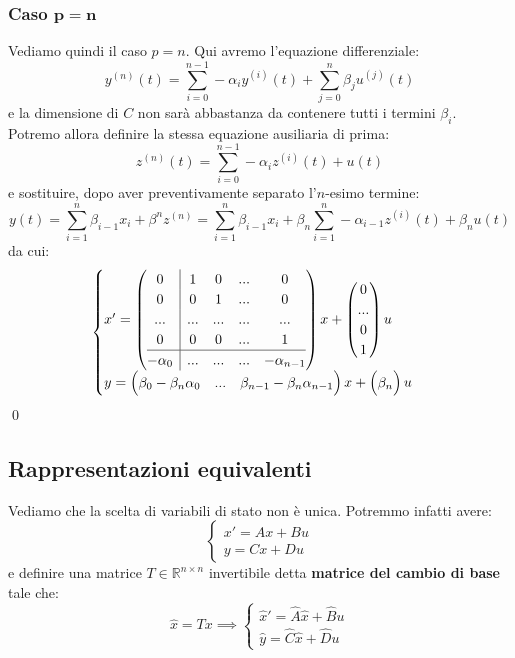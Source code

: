 \documentclass[a4paper,11pt]{article}
\begin{document}
\subsubsection{Caso $\mathbf{p = n}$}
Vediamo quindi il caso $p = n$. 
Qui avremo l'equazione differenziale:
$$
y^{(n)} (t) = \sum_{i=0}^{n-1} - \alpha_i y^{(i)}(t) + \sum_{j=0}^n \beta_j u^{(j)}(t)
$$
e la dimensione di $C$ non sarà abbastanza da contenere tutti i termini $\beta_i$.
Potremo allora definire la stessa equazione ausiliaria di prima:
$$
z^{(n)}(t) = \sum_{i = 0}^{n - 1} -\alpha_i z^{(i)}(t) + u(t)
$$
e sostituire, dopo aver preventivamente separato l'$n$-esimo termine:
$$
y(t) = \sum_{i = 1}^n \beta_{i - 1} x_i + \beta^n z^{(n)} = \sum_{i = 1}^n \beta_{i - 1} x_i + \beta_n \sum_{i = 1}^{n} -\alpha_{i - 1} z^{(i)}(t) + \beta_n u(t)
$$
da cui:
\[
	\begin{cases}	
x' = \left(\begin{array}{@{}c | cccc@{}}
	0 & 1 & 0 & ... & 0 \\
	0 & 0 & 1 & ... & 0 \\
	... & ... & ... & ... & ... \\
	0 & 0 & 0 & ... & 1 \\
	\hline
	-\alpha_0 & ... & ... & ... & -\alpha_{n - 1}
\end{array}\right)
x + \begin{pmatrix}
0 \\
... \\
0 \\
1
\end{pmatrix} u \\ 
y = \begin{pmatrix}
	\beta_0 - \beta_n \alpha_0 & ... & \beta_{n - 1} - \beta_n \alpha_{n - 1}	
\end{pmatrix} x + \begin{pmatrix}
\beta_n
\end{pmatrix} u
	\end{cases}
\]
\qed

\subsection{Rappresentazioni equivalenti}
Vediamo che la scelta di variabili di stato non è unica.
Potremmo infatti avere:
\[
	\begin{cases}
		x' = Ax + Bu \\
		y = Cx + Du
	\end{cases}
\]
e definire una matrice $T \in \mathbb{R}^{n \times n}$ invertibile detta \textbf{matrice del cambio di base} tale che:
$$
\hat{x} = Tx \implies 
\begin{cases}
	\hat{x}' = \hat{A}\hat{x} + \hat{B}u \\
	\hat{y} = \hat{C}\hat{x} + \hat{D}u
\end{cases}
$$
\end{document}
